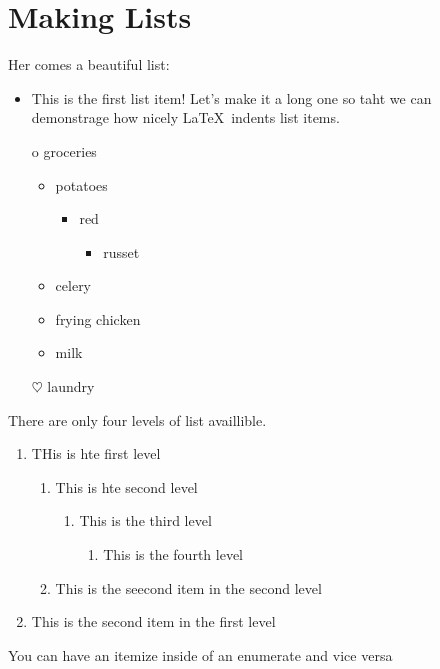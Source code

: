 \documentclass[12pt,twoside,leqno]{article}%
\begin{document}
\section{Making Lists}
Her comes a beautiful list:
\begin{itemize}
\item This is the first list item! Let's make it a long one so taht we can demonstrage how nicely \LaTeX\ indents list items.
\item[o] groceries
  \begin{itemize}
  \item potatoes
    \begin{itemize}
    \item red
  	\begin{itemize}
	\item russet
	\end{itemize}
    \end{itemize}
  \item celery
  \item frying chicken
  \item milk
  \end{itemize}
\item [$\heartsuit$] laundry
\end{itemize}

There are only four levels of list availlible.

\begin{enumerate}
\item THis is hte first level

  \begin{enumerate}
  \item This is hte second level

    \begin{enumerate}
      \item This is the third level

	\begin{enumerate}
	  \item This is the fourth level
	    \end{enumerate}
	\end{enumerate}
    \item This is the seecond item in the second level
      \end{enumerate}
  \item This is the second item in the first level
  \end{enumerate}
You can have an itemize inside of an enumerate and vice versa
\end{document}
